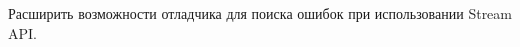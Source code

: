 \begin{frame}
	\frametitle{\insertsection} 
	\framesubtitle{\insertsubsection}
	Расширить возможности отладчика для поиска ошибок при использовании Stream API.
\end{frame}
